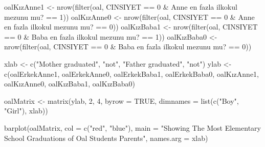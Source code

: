\documentclass[
]{article}
\newenvironment{Shaded}{\begin{snugshade}}{\end{snugshade}}
\newcommand{\AttributeTok}[1]{\textcolor[rgb]{0.77,0.63,0.00}{#1}}
\newcommand{\ConstantTok}[1]{\textcolor[rgb]{0.00,0.00,0.00}{#1}}
\newcommand{\DecValTok}[1]{\textcolor[rgb]{0.00,0.00,0.81}{#1}}
\newcommand{\FunctionTok}[1]{\textcolor[rgb]{0.00,0.00,0.00}{#1}}
\newcommand{\NormalTok}[1]{#1}
\newcommand{\OtherTok}[1]{\textcolor[rgb]{0.56,0.35,0.01}{#1}}
\newcommand{\SpecialCharTok}[1]{\textcolor[rgb]{0.00,0.00,0.00}{#1}}
\newcommand{\StringTok}[1]{\textcolor[rgb]{0.31,0.60,0.02}{#1}}
\begin{document}
\begin{Shaded}
\begin{Highlighting}[]
\NormalTok{oalKızAnne1 }\OtherTok{\textless{}{-}} \FunctionTok{nrow}\NormalTok{(}\FunctionTok{filter}\NormalTok{(oal, CINSIYET }\SpecialCharTok{==} \DecValTok{0} \SpecialCharTok{\&} \StringTok{\textasciigrave{}}\AttributeTok{Anne en fazla ilkokul mezunu mu?}\StringTok{\textasciigrave{}} \SpecialCharTok{==} \DecValTok{1}\NormalTok{))}
\NormalTok{oalKızAnne0 }\OtherTok{\textless{}{-}} \FunctionTok{nrow}\NormalTok{(}\FunctionTok{filter}\NormalTok{(oal, CINSIYET }\SpecialCharTok{==} \DecValTok{0} \SpecialCharTok{\&} \StringTok{\textasciigrave{}}\AttributeTok{Anne en fazla ilkokul mezunu mu?}\StringTok{\textasciigrave{}} \SpecialCharTok{==} \DecValTok{0}\NormalTok{))}
\NormalTok{oalKızBaba1 }\OtherTok{\textless{}{-}} \FunctionTok{nrow}\NormalTok{(}\FunctionTok{filter}\NormalTok{(oal, CINSIYET }\SpecialCharTok{==} \DecValTok{0} \SpecialCharTok{\&} \StringTok{\textasciigrave{}}\AttributeTok{Baba en fazla ilkokul mezunu mu?}\StringTok{\textasciigrave{}} \SpecialCharTok{==} \DecValTok{1}\NormalTok{))}
\NormalTok{oalKızBaba0 }\OtherTok{\textless{}{-}} \FunctionTok{nrow}\NormalTok{(}\FunctionTok{filter}\NormalTok{(oal, CINSIYET }\SpecialCharTok{==} \DecValTok{0} \SpecialCharTok{\&} \StringTok{\textasciigrave{}}\AttributeTok{Baba en fazla ilkokul mezunu mu?}\StringTok{\textasciigrave{}} \SpecialCharTok{==} \DecValTok{0}\NormalTok{))}

\NormalTok{xlab }\OtherTok{\textless{}{-}} \FunctionTok{c}\NormalTok{(}\StringTok{"Mother graduated"}\NormalTok{, }\StringTok{"not"}\NormalTok{, }\StringTok{"Father graduated"}\NormalTok{, }\StringTok{"not"}\NormalTok{)}
\NormalTok{ylab }\OtherTok{\textless{}{-}} \FunctionTok{c}\NormalTok{(oalErkekAnne1, oalErkekAnne0, oalErkekBaba1, oalErkekBaba0,}
\NormalTok{          oalKızAnne1, oalKızAnne0, oalKızBaba1, oalKızBaba0)}

\NormalTok{oalMatrix }\OtherTok{\textless{}{-}} \FunctionTok{matrix}\NormalTok{(ylab, }\DecValTok{2}\NormalTok{, }\DecValTok{4}\NormalTok{, }\AttributeTok{byrow =} \ConstantTok{TRUE}\NormalTok{, }\AttributeTok{dimnames =} \FunctionTok{list}\NormalTok{(}\FunctionTok{c}\NormalTok{(}\StringTok{"Boy"}\NormalTok{, }\StringTok{"Girl"}\NormalTok{), xlab))}

\FunctionTok{barplot}\NormalTok{(oalMatrix, }\AttributeTok{col =} \FunctionTok{c}\NormalTok{(}\StringTok{"red"}\NormalTok{, }\StringTok{"blue"}\NormalTok{), }\AttributeTok{main =} \StringTok{"Showing The Most Elementary School Graduations of Oal Students\textquotesingle{} Parents"}\NormalTok{, }\AttributeTok{names.arg =}\NormalTok{ xlab)}
\end{Highlighting}
\end{Shaded}
\end{document}
